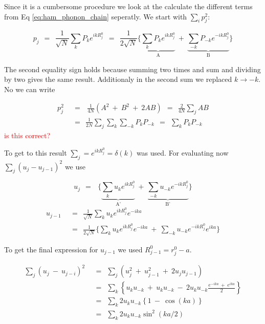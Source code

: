 \documentclass[10pt]{report}
\numberwithin{equation}{chapter}
\newcommand{\refEq}[1]{
  Eq  \ref{#1}
}
\begin{document}
Since it is a cumbersome procedure we look at the calculate the different terms from \refEq{eq:ham_phonon_chain} seperatly.
We start with $\sum_i p_j^2$:

\begin{equation}\label{eq:phonon_momentum}
  p_j ~~=~~ \frac{1}{\sqrt{N}} \sum_k P_k e^{ikR^0_j} ~~=~~ 
  \frac{1}{2\sqrt{N}} \bigg\{ 
  \underbrace{\sum_k P_k e^{ikR^0_j}}_\text{A} ~+~
  \underbrace{\sum_{-k} P_{-k} e^{-ikR^0_j}}_\text{B} \bigg\}
\end{equation}

The second equality sign holds because summing two times and sum and dividing by two gives the same result. Additionaly in the second sum we replaced $k \rightarrow -k$. No we can write

\begin{align}\label{eq:p_squared}
  p_j^2 ~~& =~~~\frac{1}{4N} \left( A^2 ~+~ B^2 ~+~ 2AB \right)
  ~~=~~ \frac{2}{4N} \sum_j AB \nonumber \\
  ~~& =~~ \frac{1}{2N} \sum_j \sum_k \sum_{-k} P_k P_{-k}
  ~~=~~ \sum_k P_k P_{-k}
\end{align}
\textcolor{red}{is this correct?}

To get to this result $\sum_j = e^{ikR^0_j} = \delta(k)$ was used.
For evaluating now $\sum_j (u_j - u_{j-1})^2$ we use

\begin{equation}
  u_j ~~=~~~\Bigg\{ \underbrace{\sum_k u_k e^{ikR_j^0}}_\text{A'} ~+~
  \underbrace{\sum_{-k} u_{-k} e^{-ikR_j^0}}_\text{B'} \Bigg\}
\end{equation}
\begin{align}
  u_{j-1} ~~& =~~ \frac{1}{\sqrt{N}} \sum_k u_k e^{ikR_j^0} e^{-ika}\nonumber \\
  ~~& =~~ \frac{1}{2\sqrt{N}} \Bigg\{ \sum_k u_k e^{ikR_j^0} e^{-ika} ~+~
  \sum_{-k} u_{-k} e^{-ikR_j^0} e^{ika} \Bigg\}
\end{align}

To get the final expression for $u_{j-1}$ we used $R_{j-1}^0=r_j^0-a$.

\begin{align}
  \sum_j (u_j ~-~ u_{j-i})^2 ~~& =~~ \sum_j (u_j^2 ~+~ u_{j-1}^2 ~+~ 2u_j u_{j-1})\nonumber \\
  ~~& =~~ \sum_k \left\{ u_k u_{-k} ~+~ u_k u_{-k} ~-~ 2u_k u_{-k} \frac{e^{-ika} ~+~ e^{ika}}{2} \right\}\nonumber \\ 
  ~~& =~~ \sum_k 2 u_k u_{-k} \left\{1 ~-~ \cos(ka) \right\}\nonumber \\
  ~~& =~~ \sum_k 2 u_k u_{-k} \sin^2(ka/2)
\end{align}
\end{document}
